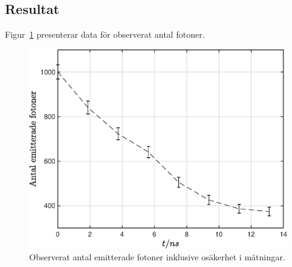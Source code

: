 \subsection*{Resultat}
Figur~\ref{fig:1_1} presenterar data för observerat antal fotoner.
\begin{figure}[H]
    \centering
    \captionsetup{justification=centering,margin=2cm}
    \includegraphics[scale=0.4]{Resources/Graphics/fig1_1.eps}
    \caption{Observerat antal emitterade fotoner inklusive osäkerhet i mätningar.}
    \label{fig:1_1}
\end{figure}

